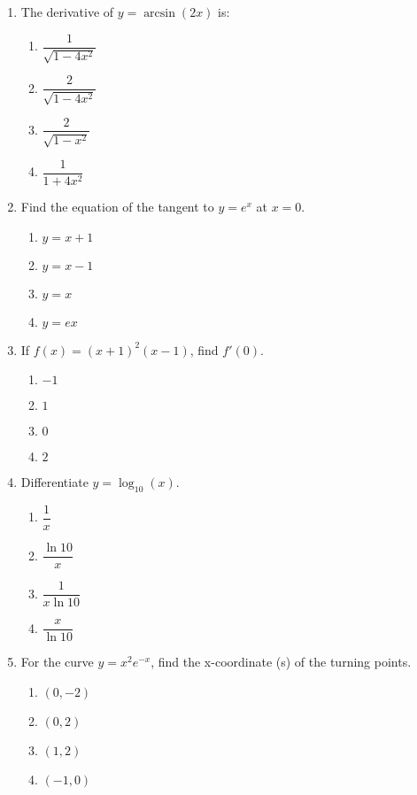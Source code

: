 \begin{multicols}{2}
\begin{enumerate}[label={\arabic*.}]
    \item The derivative of \(y = \arcsin(2x)\) is:
      \begin{enumerate}[label={\Alph*.}]
        \item \(\dfrac{1}{\sqrt{1-4x^2}}\)
        \item \(\dfrac{2}{\sqrt{1-4x^2}}\)
        \item \(\dfrac{2}{\sqrt{1-x^2}}\)
        \item \(\dfrac{1}{1+4x^2}\)
      \end{enumerate}
    \item Find the equation of the tangent to \(y=e^x\) at \(x=0\).
      \begin{enumerate}[label={\Alph*.}]
        \item \(y=x+1\)
        \item \(y=x-1\)
        \item \(y=x\)
        \item \(y=ex\)
      \end{enumerate}
    \item If \(f(x) = {(x+1)}^2 (x-1)\), find \(f'(0)\).
      \begin{enumerate}[label={\Alph*.}]
        \item \(-1\)
        \item \(1\)
        \item \(0\)
        \item \(2\)
      \end{enumerate}
    \item Differentiate \(y = \log_{10}(x)\).
      \begin{enumerate}[label={\Alph*.}]
        \item \(\dfrac{1}{x}\)
        \item \(\dfrac{\ln 10}{x}\)
        \item \(\dfrac{1}{x \ln 10}\)
        \item \(\dfrac{x}{\ln 10}\)
      \end{enumerate}
    \item For the curve \(y = x^2 e^{-x}\), find the x-coordinate (s) of the turning points.
      \begin{enumerate}[label={\Alph*.}]
        \item \((0, -2)\)
        \item \((0, 2)\)
        \item \((1, 2)\)
        \item \((-1, 0)\)
      \end{enumerate}

\end{enumerate}
\end{multicols}

